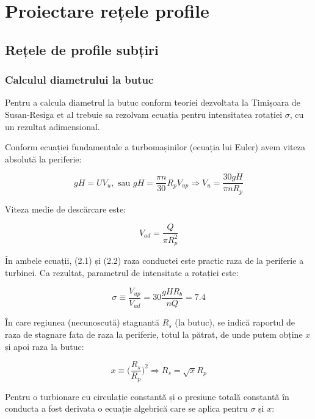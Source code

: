 \chapter{Proiectare rețele profile}\label{chapter:proiectare}

\section{Rețele de profile subțiri}

\subsection{Calculul diametrului la butuc}

Pentru a calcula diametrul la butuc conform teoriei dezvoltata la Timișoara de Susan-Resiga et al \cite{susanhub} trebuie sa rezolvam ecuația pentru intensitatea rotației $\sigma$, cu un rezultat adimensional.

Conform ecuației fundamentale a turbomașinilor (ecuația lui Euler) avem viteza absolută la periferie:

\begin{equation}
gH=UV_{u}, \text{ sau } gH=\frac{\pi n}{30} R_{p} V_{up} \Rightarrow V_{u}=\frac{30gH}{\pi n R_{p}}
\end{equation}

Viteza medie de descărcare este:

\begin{equation}
V_{ad}=\frac{Q}{\pi R_{p}^2}
\end{equation}

În ambele ecuații, (2.1) și (2.2) raza conductei este practic raza de la periferie a turbinei. Ca rezultat, parametrul de intensitate a rotației este:

\begin{equation}
\sigma \equiv \frac{V_{up}}{V_{ad}} = 30 \frac{g H R_{b}}{n Q} = 7.4
\end{equation}

În care regiunea (necunoscută) stagnantă $R_{s}$ (la butuc), se indică raportul de raza de stagnare fata de raza la periferie, totul la pătrat, de unde putem obține $x$ și apoi raza la butuc:

\begin{equation}
x \equiv \bigg(\frac{R_{s}}{R_{p}}\bigg)^2 \Rightarrow R_{s} = \sqrt{x} R_{p}
\end{equation}

Pentru o turbionare cu circulație constantă și o presiune totală constantă în conducta a fost derivata \cite{susanhub} o ecuație algebrică care se aplica pentru $\sigma$ și $x$:

